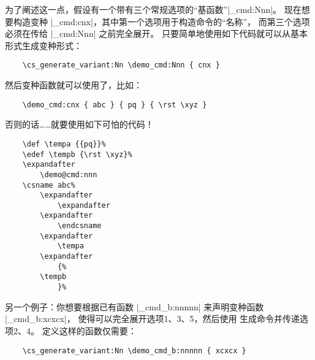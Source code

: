 \documentclass[full]{l3doc}
\begin{document}
%
为了阐述这一点，假设有一个带有三个常规选项的“基函数”|\demo_cmd:Nnn|。
现在想要构造变种  |\demo_cmd:cnx|，其中第一个选项用于构造命令的“名称”，
而第三个选项必须在传给 |\demo_cmd:Nnn| 之前完全展开。
只要简单地使用如下代码就可以从基本形式生成变种形式：
\begin{verbatim}
    \cs_generate_variant:Nn \demo_cmd:Nnn { cnx }
\end{verbatim}
然后变种函数就可以使用了，比如：
\begin{verbatim}
    \demo_cmd:cnx { abc } { pq } { \rst \xyz }
\end{verbatim}
否则的话……就要使用如下可怕的代码！
\begin{verbatim}
    \def \tempa {{pq}}%
    \edef \tempb {\rst \xyz}%
    \expandafter
        \demo@cmd:nnn
    \csname abc%
        \expandafter
            \expandafter
        \expandafter
            \endcsname
        \expandafter
            \tempa
        \expandafter
            {%
        \tempb
            }%
\end{verbatim}

%
另一个例子：你想要根据已有函数 |\demo_cmd_b:nnnnn| 来声明变种函数 |\demo_cmd_b:xcxcx|，
使得可以完全展开选项1、3、5，然后使用  生成命令并传递选项2、4。
定义这样的函数仅需要：
\begin{verbatim}
    \cs_generate_variant:Nn \demo_cmd_b:nnnnn { xcxcx }
\end{verbatim}
\end{document}
